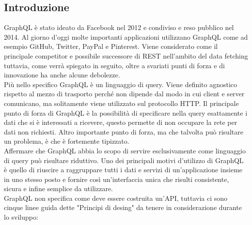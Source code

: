 \subsection*{Introduzione}
GraphQL è stato ideato da Facebook nel 2012 e condiviso e reso pubblico nel 2014. Al giorno d'oggi molte importanti applicazioni utilizzano GraphQL come ad esempio GitHub, Twitter, PayPal e Pinterest. Viene considerato come il principale competitor e possibile successore di REST nell'ambito del data fetching tuttavia, come verrà spiegato in seguito, oltre a svariati punti di forza e di innovazione ha anche alcune debolezze.\\
Più nello specifico GraphQL è un linguaggio di query. Viene definito agnostico rispetto al mezzo di trasporto perché non dipende dal modo in cui client e server comunicano, ma solitamente viene utilizzato sul protocollo HTTP. Il principale punto di forza di GraphQL è la possibilità di specificare nella query esattamente i dati che si è interessati a ricevere, questo permette di non occupare la rete per dati non richiesti. Altro importante punto di forza, ma che talvolta può risultare un problema, è che è fortemente tipizzato.\\
Affermare che GraphQL abbia lo scopo di servire esclusivamente come linguaggio di query può risultare riduttivo. Uno dei principali motivi d'utilizzo di GraphQL è quello di riuscire a raggruppare tutti i dati e servizi di un'applicazione insieme in uno stesso posto e fornire così un'interfaccia unica che risulti consistente, sicura e infine semplice da utilizzare.\\
GraphQL non specifica come deve essere costruita un'API, tuttavia ci sono cinque linee guida dette "Principi di desing" da tenere in considerazione durante lo sviluppo:
